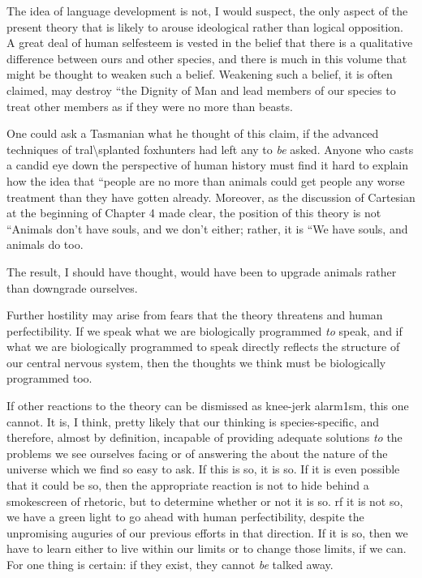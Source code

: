 The idea of language development is not, I would suspect, the only aspect of the present theory that is likely to arouse ideological rather than logical opposition. A great deal of human self{\textquotedbl}esteem is vested in the belief that there is a qualitative difference between ours and other species, and there is much in this volume that might be thought to weaken such a belief. Weakening such a belief, it is often claimed, may destroy ``the Dignity of Man and lead members of our species to treat other members as if they were no more than beasts.

One could ask a Tasmanian what he thought of this claim, if the advanced techniques of tral{\textbackslash}splanted  foxhunters had
left any  to \textit{be} asked. Anyone who casts a candid eye down the perspective of human history must find it hard to explain how the idea that ``people are no more than animals could get people any worse treatment than they have gotten already. Moreover, as the discussion of Cartesian  at the beginning of Chapter 4 made clear, the position of this theory is not ``Animals don't have souls, and we don't either{\textquotedbl}; rather, it is ``We have souls, and animals do too.{\textquotedbl}

The result, I should have thought, would have been to upgrade animals rather than downgrade ourselves.

Further hostility may arise from fears that the theory threatens  and human perfectibility. If we speak what we are biologically programmed \textit{to} speak, and if what we are biologically programmed to speak directly reflects the structure of our central nervous system, then the thoughts we think must be biologically programmed too.

If other reactions to the theory can be dismissed as knee-jerk alarm1sm, this one cannot. It is, I think, pretty likely that our think\-ing is species-specific, and therefore, almost by definition, incapable of providing adequate solutions \textit{to }the problems we see ourselves facing or of answering the  about the nature of the universe which we find so easy to ask. If this is so, it is so. If it is even possible that it could be so, then the appropriate reaction is not to hide behind a smokescreen of rhetoric, but to determine whether or not it is so. rf it is not so, we have a green light to go ahead with human perfectibility, despite the unpromising auguries of our previous efforts in that direc\-tion. If it is so, then we have to learn either to live within our limits
or to change those limits, if we can. For one thing is certain: if they exist, they cannot \textit{be} talked away.

